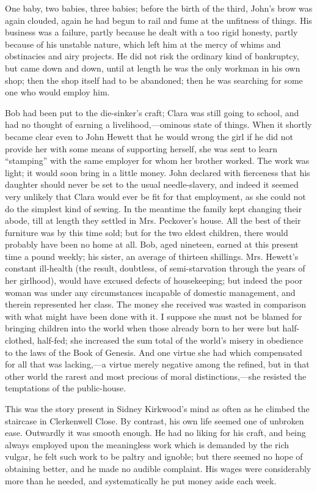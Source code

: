 One baby, two babies, three babies; before the birth of the third,
John's brow was again clouded, again he had begun to rail and fume at
the unfitness of things. His business was a failure, partly because he
dealt with a too rigid honesty, partly because of his unstable nature,
which left him at the mercy of whims and obstinacies and airy projects.
He did not risk the ordinary kind of bankruptcy, but came down and down,
until at length he was the only workman in his own shop; then the shop
itself had to be abandoned; then he was searching for some one who would
employ him.

Bob had been put to the die-sinker's craft; Clara was still going to
school, and had no thought of earning a livelihood,---ominous {}state of
things. When it shortly became clear even to John Hewett that he would
wrong the girl if he did not provide her with some means of supporting
herself, she was sent to learn ``stamping'' with the same employer for
whom her brother worked. The work was light; it would soon bring in a
little money. John declared with fierceness that his daughter should
never be set to the usual needle-slavery, and indeed it seemed very
unlikely that Clara would ever be fit for that employment, as she could
not do the simplest kind of sewing. In the meantime the family kept
changing their abode, till at length they settled in Mrs. Peckover's
house. All the best of their furniture was by this time sold; but for
the two eldest children, there would probably have been no home at all.
Bob, aged nineteen, earned at this present time a pound weekly; his
sister, an average of thirteen shillings. Mrs. Hewett's constant
ill-health (the result, doubtless, of semi-starvation through the years
of her girlhood), would have excused defects of housekeeping; but
{}indeed the poor woman was under any circumstances incapable of
domestic management, and therein represented her class. The money she
received was wasted in comparison with what might have been done with
it. I suppose she must not be blamed for bringing children into the
world when those already born to her were but half-clothed, half-fed;
she increased the sum total of the world's misery in obedience to the
laws of the Book of Genesis. And one virtue she had which compensated
for all that was lacking,---a virtue merely negative among the refined,
but in that other world the rarest and most precious of moral
distinctions,---she resisted the temptations of the public-house.

This was the story present in Sidney Kirkwood's mind as often as he
climbed the staircase in Clerkenwell Close. By contrast, his own life
seemed one of unbroken ease. Outwardly it was smooth enough. He had no
liking for his craft, and being always employed upon the meaningless
work which is demanded {}by the rich vulgar, he felt such work to be
paltry and ignoble; but there seemed no hope of obtaining better, and he
made no audible complaint. His wages were considerably more than he
needed, and systematically he put money aside each week.


